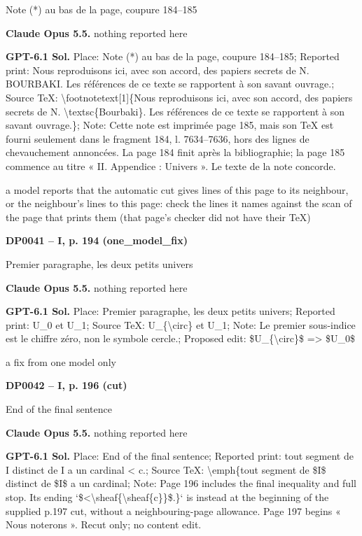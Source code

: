 Note (*) au bas de la page, coupure 184–185\par
\textbf{Claude Opus 5.5.} nothing reported here\par
\textbf{GPT-6.1 Sol.} Place: Note (*) au bas de la page, coupure 184–185; Reported print: Nous reproduisons ici, avec son accord, des papiers secrets de N. BOURBAKI. Les références de ce texte se rapportent à son savant ouvrage.; Source TeX: \textbackslash{}footnotetext[1]\{Nous reproduisons ici, avec son accord, des papiers secrets de N. \textbackslash{}textsc\{Bourbaki\}. Les références de ce texte se rapportent à son savant ouvrage.\}; Note: Cette note est imprimée page 185, mais son TeX est fourni seulement dans le fragment 184, l. 7634–7636, hors des lignes de chevauchement annoncées. La page 184 finit après la bibliographie; la page 185 commence au titre « II. Appendice : Univers ». Le texte de la note concorde.\par
a model reports that the automatic cut gives lines of this page to its neighbour, or the neighbour's lines to this page: check the lines it names against the scan of the page that prints them (that page's checker did not have their TeX)\par
\par\noindent\hypertarget{DP0041}{}\textbf{DP0041 -- I, p. 194 (one\_model\_fix)}\par
Premier paragraphe, les deux petits univers\par
\textbf{Claude Opus 5.5.} nothing reported here\par
\textbf{GPT-6.1 Sol.} Place: Premier paragraphe, les deux petits univers; Reported print: U\_0 et U\_1; Source TeX: U\_\{\textbackslash{}circ\} et U\_1; Note: Le premier sous-indice est le chiffre zéro, non le symbole cercle.; Proposed edit: \$U\_\{\textbackslash{}circ\}\$ =\allowbreak > \$U\_0\$\par
a fix from one model only\par
\par\noindent\hypertarget{DP0042}{}\textbf{DP0042 -- I, p. 196 (cut)}\par
End of the final sentence\par
\textbf{Claude Opus 5.5.} nothing reported here\par
\textbf{GPT-6.1 Sol.} Place: End of the final sentence; Reported print: tout segment de I distinct de I a un cardinal < c.; Source TeX: \textbackslash{}emph\{tout segment de \$I\$ distinct de \$I\$ a un cardinal; Note: Page 196 includes the final inequality and full stop. Its ending `\$<\textbackslash{}sheaf\{\textbackslash{}sheaf\{c\}\}\$.\}` is instead at the beginning of the supplied p.197 cut, without a neighbouring-page allowance. Page 197 begins « Nous noterons ». Recut only; no content edit.\par
